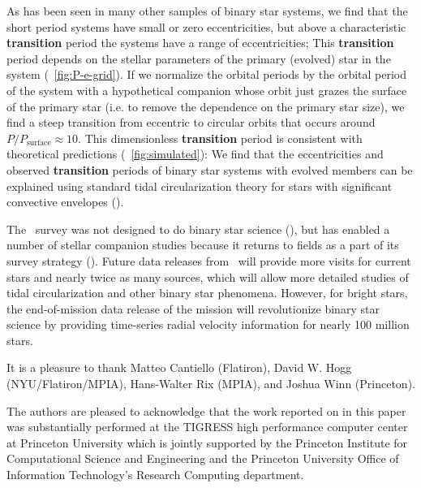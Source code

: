 \documentclass[modern, letterpaper]{aastex62}
\newcommand{\apogee}{\project{\acronym{APOGEE}}}
\newcommand{\sdssiv}{\project{\acronym{SDSS-IV}}}
\newcommand{\Psurf}{\ensuremath{P_\textrm{surface}}}
\renewcommand{\changes}[1]{\textbf{#1}}
\begin{document}
As has been seen in many other samples of binary star systems, we find that the
short period systems have small or zero eccentricities, but above a
characteristic \changes{transition} period the systems have a range of
eccentricities; This \changes{transition} period depends on the stellar
parameters of the primary (evolved) star in the system
(\figurename~\ref{fig:P-e-grid}).
If we normalize the orbital periods by the orbital period of the system with a
hypothetical companion whose orbit just grazes the surface of the primary star
(i.e. to remove the dependence on the primary star size), we find a steep
transition from eccentric to circular orbits that occurs around $P / \Psurf
\approx 10$.
This dimensionless \changes{transition} period is consistent with theoretical
predictions (\figurename~\ref{fig:simulated}):
We find that the eccentricities and observed \changes{transition} periods of
binary star systems with evolved members can be explained using standard tidal
circularization theory for stars with significant convective envelopes
(\citealt{Zahn:1977, Zahn:1989, Verbunt:1995}).

The \apogee\ survey was not designed to do binary star science
(\citealt{Majewski:2017}), but has enabled a number of stellar companion studies
because it returns to fields as a part of its survey strategy
(\citealt{Troup:2016, Badenes:2018, Price-Whelan:2018}).
Future data releases from \apogee\ will provide more visits for current stars
and nearly twice as many sources, which will allow more detailed studies of
tidal circularization and other binary star phenomena.
However, for bright stars, the end-of-mission data release of the 
mission will revolutionize binary star science by providing time-series radial
velocity information for nearly 100 million stars.

\acknowledgements

It is a pleasure to thank
Matteo Cantiello (Flatiron),
David W. Hogg (NYU/Flatiron/MPIA),
Hans-Walter Rix (MPIA),
and Joshua Winn (Princeton).

The authors are pleased to acknowledge that the work reported on in this
paper was substantially performed at the TIGRESS high performance computer
center at Princeton University which is jointly supported by the Princeton
Institute for Computational Science and Engineering and the Princeton
University Office of Information Technology's Research Computing department.


\facility{\sdssiv, \apogee}



\end{document}
